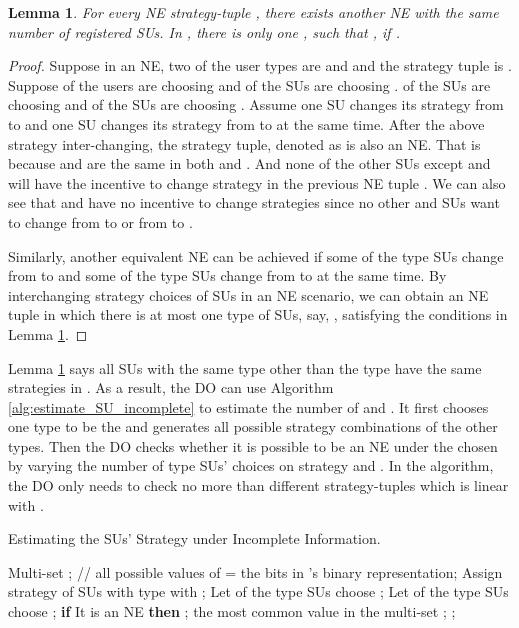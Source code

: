 \documentclass[journal]{IEEEtran}
\newtheorem{lemma}[theorem]{Lemma}
\begin{document}
\begin{lemma}
\label{lemma:NDRG_property_incomplete}
For every NE strategy-tuple , there exists another NE  with the same number of registered SUs. In , there is only one , such that , if .
\end{lemma}
\begin{proof}
Suppose in an NE, two of the user types are  and  and the strategy tuple is . Suppose  of the  users are choosing  and  of the  SUs are choosing .  of the  SUs are choosing  and  of the  SUs are choosing . Assume one  SU  changes its strategy from  to  and one  SU  changes its strategy from  to  at the same time. After the above strategy inter-changing, the strategy tuple, denoted as  is also an NE. That is because  and  are the same in both  and .
And none of the other SUs except  and  will have the incentive to change strategy in the previous NE tuple . We can also see that  and  have no incentive to change strategies since no other  and  SUs want to change from  to  or from  to .

Similarly, another equivalent NE can be achieved if some of the type  SUs change from  to  and some of the type  SUs change from  to  at the same time. By interchanging strategy choices of SUs in an NE scenario, we can obtain an NE tuple  in which there is at most one type of SUs, say, , satisfying the conditions in Lemma \ref{lemma:NDRG_property_incomplete}.
\end{proof}

Lemma \ref{lemma:NDRG_property_incomplete} says all SUs with the same type other than the type  have the same strategies in .
As a result, the DO can use Algorithm \ref{alg:estimate_SU_incomplete} to estimate the number of  and . It first chooses one type to be the  and generates all possible strategy combinations of the other types. Then the DO checks whether it is possible to be an NE under the chosen  by varying the number of  type SUs' choices on strategy  and . In the algorithm, the DO only needs to check no more than  different strategy-tuples which is linear with .

\begin{algorithm}[tp]
\caption {Estimating the SUs' Strategy under Incomplete Information.}
\label{alg:estimate_SU_incomplete}
\begin{algorithmic}[1]
\STATE Multi-set ; // all possible values of 
\STATE = the bits in 's binary representation;
\STATE Assign strategy of SUs with type  with ;
\STATE Let  of the type  SUs choose ;
\STATE Let  of the type  SUs choose ;
\STATE \textbf{if} {It is an NE} \textbf{then} ;
\ENDFOR
\ENDFOR
\ENDFOR
\STATE  the most common value in the multi-set ;
\STATE ;
\end{algorithmic}
\end{algorithm}
\end{document}
